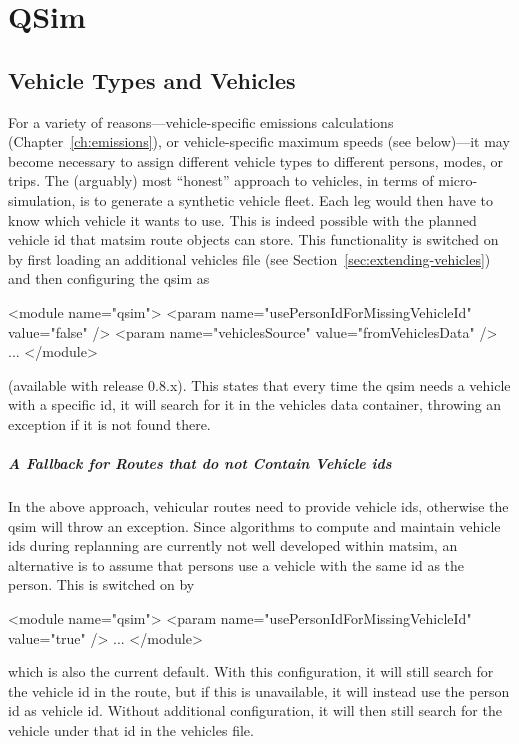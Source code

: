 \chapter{QSim}
\label{sec:extending-qsim}

\section{Vehicle Types and Vehicles}
\label{sec:vehicles-in-qsim}

For a variety of reasons---\eg vehicle-specific emissions calculations (Chapter~\ref{ch:emissions}), or vehicle-specific maximum speeds (see below)---it may become necessary to assign different vehicle types to different persons, modes, or trips.
%
The (arguably) most ``honest'' approach to vehicles, in terms of micro-simulation, is to generate a synthetic vehicle fleet.  Each leg would then have to know which vehicle it wants to use.  This is indeed possible with the planned vehicle \gls{id} that \Gls{matsim} route objects can store.  This functionality is switched on by first loading an additional vehicles file (see Section~\ref{sec:extending-vehicles}) and then configuring the \gls{qsim} as
\begin{xml}
<module name="qsim">
   <param name="usePersonIdForMissingVehicleId" value="false" />
   <param name="vehiclesSource" value="fromVehiclesData" />
   ...
</module>
\end{xml}
(available with release 0.8.x).  This states that every time the \gls{qsim} needs a vehicle with a specific \gls{id}, it will search for it in the vehicles data container, throwing an exception if it is not found there.  

\paragraph{A Fallback for Routes that do not Contain Vehicle \glspl{id}}

In the above approach, vehicular routes need to provide vehicle \glspl{id}, otherwise the \gls{qsim} will throw an exception.  Since algorithms to compute and maintain vehicle \glspl{id} during replanning are currently not well developed within \gls{matsim}, an alternative is to assume that persons use a vehicle with the same \gls{id} as the person.  This is switched on by
\begin{xml}
<module name="qsim">
   <param name="usePersonIdForMissingVehicleId" value="true" />
   ...
</module>
\end{xml}
which is also the current default.
%
With this configuration, it will still search for the vehicle \gls{id} in the route, but if this is unavailable, it will instead use the person \gls{id} as vehicle \gls{id}.  Without additional configuration, it will then still search for the vehicle under that \gls{id} in the vehicles file.

